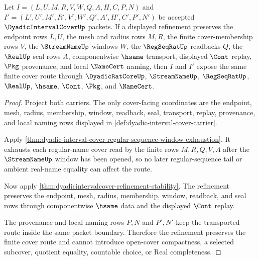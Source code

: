 \begin{theorem}
\label{thm:dyadicintervalcover-route-cover-stability}
Let $I=(L,U,M,R,V,W,Q,A,H,C,P,N)$ and $I'=(L',U',M',R',V',W',Q',A',H',C',P',N')$ be accepted $\DyadicIntervalCoverUp$ packets. If a displayed refinement preserves the endpoint rows $L,U$, the mesh and radius rows $M,R$, the finite cover-membership rows $V$, the $\StreamNameUp$ windows $W$, the $\RegSeqRatUp$ readbacks $Q$, the $\RealUp$ seal rows $A$, componentwise $\hsame$ transport, displayed $\Cont$ replay, $\Pkg$ provenance, and local $\NameCert$ naming, then $I$ and $I'$ expose the same finite cover route through $\DyadicRatCoreUp$, $\StreamNameUp$, $\RegSeqRatUp$, $\RealUp$, $\hsame$, $\Cont$, $\Pkg$, and $\NameCert$.
\end{theorem}
\begin{proof}
Project both carriers. The only cover-facing coordinates are the endpoint, mesh, radius, membership, window, readback, seal, transport, replay, provenance, and local naming rows displayed in \autoref{def:dyadic-interval-cover-carrier}.

Apply \autoref{thm:dyadic-interval-cover-regular-sequence-window-exhaustion}. It exhausts each regular-name cover read by the finite rows $M,R,Q,V,A$ after the $\StreamNameUp$ window has been opened, so no later regular-sequence tail or ambient real-name equality can affect the route.

Now apply \autoref{thm:dyadicintervalcover-refinement-stability}. The refinement preserves the endpoint, mesh, radius, membership, window, readback, and seal rows through componentwise $\hsame$ data and the displayed $\Cont$ replay.

The provenance and local naming rows $P,N$ and $P',N'$ keep the transported route inside the same packet boundary. Therefore the refinement preserves the finite cover route and cannot introduce open-cover compactness, a selected subcover, quotient equality, countable choice, or Real completeness.
\end{proof}

